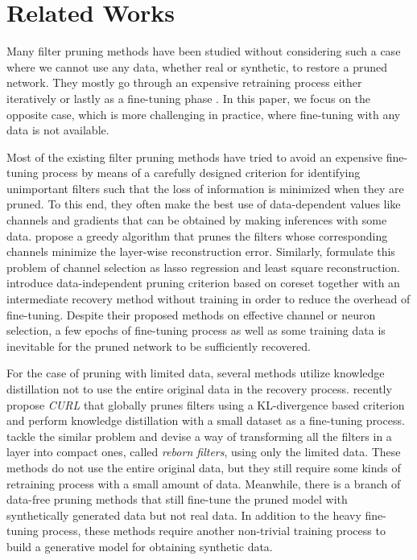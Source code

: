 \section{Related Works} \label{sec:related}
Many filter pruning methods have been studied without considering such a case where we cannot use any data, whether real or synthetic, to restore a pruned network. They mostly go through an expensive retraining process either iteratively \cite{Soft,FPGM,Dynamic} or lastly as a fine-tuning phase \cite{GlobalRanking,Importance,NISP}. In this paper, we focus on the opposite case, which is more challenging in practice, where fine-tuning with any data is not available.

Most of the existing filter pruning methods have tried to avoid an expensive fine-tuning process by means of a carefully designed criterion for identifying unimportant filters such that the loss of information is minimized when they are pruned. To this end, they often make the best use of data-dependent values like channels and gradients that can be obtained by making inferences with some data. \cite{Thinet} propose a greedy algorithm that prunes the filters whose corresponding channels minimize the layer-wise reconstruction error. Similarly, \cite{Lasso} formulate this problem of channel selection as lasso regression and least square reconstruction. \cite{CoreSet_ICLR} introduce data-independent pruning criterion based on coreset together with an intermediate recovery method without training in order to reduce the overhead of fine-tuning. Despite their proposed methods on effective channel or neuron selection, a few epochs of fine-tuning process as well as some training data is inevitable for the pruned network to be sufficiently recovered. 


For the case of pruning with limited data, several methods \cite{CURL,Reborn} utilize knowledge distillation \cite{Knowledge_Distilation} not to use the entire original data in the recovery process. \cite{CURL} recently propose \textit{CURL} that globally prunes filters using a KL-divergence based criterion and perform knowledge distillation with a small dataset as a fine-tuning process. \cite{Reborn} tackle the similar problem and devise a way of transforming all the filters in a layer into compact ones, called \textit{reborn filters}, using only the limited data. These methods do not use the entire original data, but they still require some kinds of retraining process with a small amount of data. Meanwhile, there is a branch of data-free pruning methods \cite{Data-Free-NetworkPruning, DeepInversion} that still fine-tune the pruned model with synthetically generated data but not real data. In addition to the heavy fine-tuning process, these methods require another non-trivial training process to build a generative model for obtaining synthetic data.

